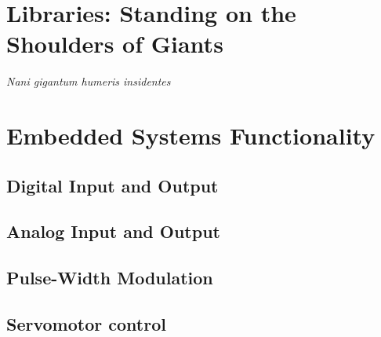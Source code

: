 \documentclass[letterpaper, 11pt]{memoir}
\begin{document}




\chapter{Libraries: Standing on the Shoulders of Giants}
\emph{Nani gigantum humeris insidentes}

\chapter{Embedded Systems Functionality}
\section{Digital Input and Output}
\section{Analog Input and Output}
\section{Pulse-Width Modulation}
\section{Servomotor control}


\end{document}

